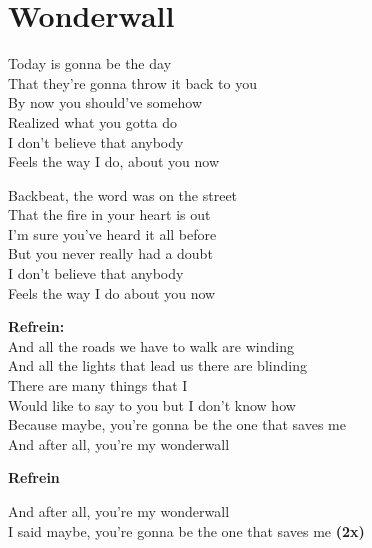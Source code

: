 \section{Wonderwall}
Today is gonna be the day\\
That they're gonna throw it back to you\\
By now you should've somehow\\
Realized what you gotta do\\
I don't believe that anybody\\
Feels the way I do, about you now

Backbeat, the word was on the street\\
That the fire in your heart is out\\
I'm sure you've heard it all before\\
But you never really had a doubt\\
I don't believe that anybody\\
Feels the way I do about you now

\textbf{Refrein:}\\
And all the roads we have to walk are winding\\
And all the lights that lead us there are blinding\\
There are many things that I\\
Would like to say to you but I don't know how\\
Because maybe, you're gonna be the one that saves me\\
And after all, you're my wonderwall

\textbf{Refrein}

And after all, you're my wonderwall\\
I said maybe, you're gonna be the one that saves me \textbf{(2x)}